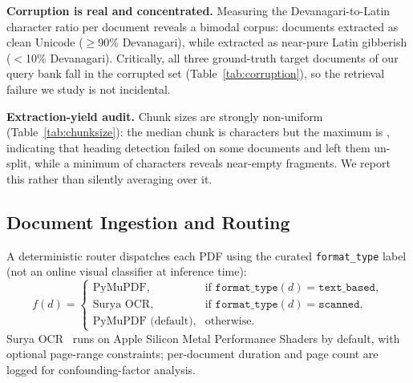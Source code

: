 \documentclass[conference]{IEEEtran}
\begin{document}
\textbf{Corruption is real and concentrated.} Measuring the Devanagari-to-Latin character ratio per document reveals a bimodal corpus: \corpusCleanDocs{} documents extracted as clean Unicode ($\geq$90\% Devanagari), while \corpusCorruptDocs{} extracted as near-pure Latin gibberish ($<$10\% Devanagari). Critically, all three ground-truth target documents of our query bank fall in the corrupted set (Table~\ref{tab:corruption}), so the retrieval failure we study is not incidental.

\begin{table}[t]
\caption{Devanagari character ratio: the queried documents are corrupted}
\label{tab:corruption}
\centering

\end{table}

\textbf{Extraction-yield audit.} Chunk sizes are strongly non-uniform (Table~\ref{tab:chunksize}): the median chunk is \chunkLenMedian{} characters but the maximum is \chunkLenMax{}, indicating that heading detection failed on some documents and left them un-split, while a minimum of \chunkLenMin{} characters reveals near-empty fragments. We report this rather than silently averaging over it.

\begin{table}[t]
\caption{Chunk-size distribution (characters) over all \corpusChunks{} chunks}
\label{tab:chunksize}
\centering

\end{table}

\subsection{Document Ingestion and Routing}
A deterministic router dispatches each PDF using the curated \texttt{format\_type} label (not an online visual classifier at inference time):
\begin{equation}
f(d)=\begin{cases}
\text{PyMuPDF}, & \text{if }\texttt{format\_type}(d)=\texttt{text\_based},\\
\text{Surya OCR}, & \text{if }\texttt{format\_type}(d)=\texttt{scanned},\\
\text{PyMuPDF (default)}, & \text{otherwise}.
\end{cases}
\end{equation}
Surya OCR~\cite{surya2024} runs on Apple Silicon Metal Performance Shaders by default, with optional page-range constraints; per-document duration and page count are logged for confounding-factor analysis.
\end{document}
